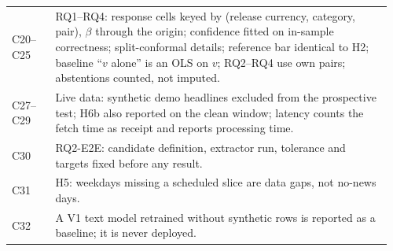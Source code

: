\begin{small}
\begin{tabular}{@{}p{0.11\linewidth}p{0.85\linewidth}@{}}
C20--C25 & RQ1--RQ4: response cells keyed by (release currency, category, pair), $\beta$ through the origin; confidence fitted on in-sample correctness; split-conformal details; reference bar identical to H2; baseline ``$v$ alone'' is an OLS on $v$; RQ2--RQ4 use own pairs; abstentions counted, not imputed. \\
C27--C29 & Live data: synthetic demo headlines excluded from the prospective test; H6b also reported on the clean window; latency counts the fetch time as receipt and reports processing time. \\
C30 & RQ2-E2E: candidate definition, extractor run, tolerance and targets fixed before any result. \\
C31 & H5: weekdays missing a scheduled slice are data gaps, not no-news days. \\
C32 & A V1 text model retrained without synthetic rows is reported as a baseline; it is never deployed. \\
\bottomrule
\end{tabular}
\end{small}
